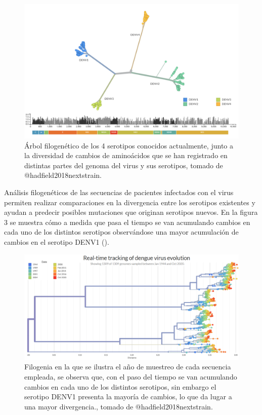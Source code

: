 \documentclass[
  12pt, krantz2,
  spanish,
]{krantz}
\begin{document}
\begin{figure}
\includegraphics[width=0.8\linewidth]{figures/DenvFigura2} \caption{Árbol filogenético de los 4 serotipos conocidos actualmente, junto a la diversidad de cambios de aminoácidos que se han registrado en distintas partes del genoma del virus y sus serotipos, tomado de @hadfield2018nextstrain.}\label{fig:DenvSerotypes}
\end{figure}

Análisis filogenéticos de las secuencias de pacientes infectados con el virus permiten realizar comparaciones en la divergencia entre los serotipos existentes y ayudan a predecir posibles mutaciones que originan serotipos nuevos. En la figura 3 se muestra cómo a medida que pasa el tiempo se van acumulando cambios en cada uno de los distintos serotipos observándose una mayor acumulación de cambios en el serotipo DENV1 (\citet{hadfield2018nextstrain}).

\begin{figure}
\includegraphics[width=0.8\linewidth]{figures/DenvFigura3} \caption{Filogenia en la que se ilustra el año de muestreo de cada secuencia empleada, se observa que, con el paso del tiempo se van acumulando cambios en cada uno de los distintos serotipos, sin embargo el serotipo DENV1 presenta la mayoría de cambios, lo que da lugar a una mayor divergencia., tomado de @hadfield2018nextstrain.}\label{fig:DenvPhyl}
\end{figure}
\end{document}
